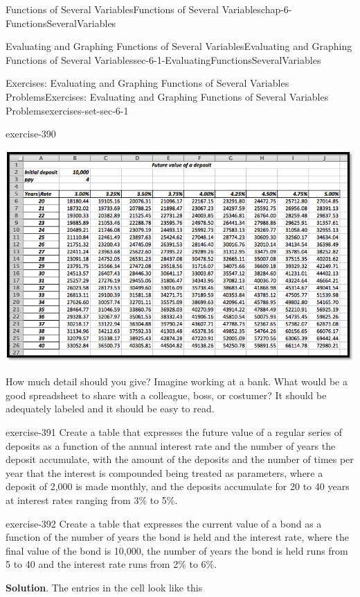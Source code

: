 \documentclass[oneside,10pt,]{book}
\numberwithin{equation}{section}
\begin{document}
\begin{chapterptx}{Functions of Several Variables}{}{Functions of Several Variables}{}{}{chap-6-FunctionsSeveralVariables}
\begin{sectionptx}{Evaluating and Graphing Functions of Several Variables}{}{Evaluating and Graphing Functions of Several Variables}{}{}{sec-6-1-EvaluatingFunctionsSeveralVariables}
\begin{exercises-subsection-numberless}{Exercises: Evaluating and Graphing Functions of Several Variables Problems}{}{Exercises: Evaluating and Graphing Functions of Several Variables Problems}{}{}{exercises-set-sec-6-1}
\begin{exercisegroup}
\begin{divisionexerciseeg}{13}{}{}{exercise-390}
\begin{sidebyside}{1}{0}{0}{0}
\begin{sbspanel}{1}
\includegraphics[width=1\linewidth]{images/sec6-1-sol13b.png}
\end{sbspanel}%
\end{sidebyside}%
\par
\hypertarget{p-2194}{}%
How much detail should you give? Imagine working at a bank. What would be a good spreadsheet to share with a colleague, boss, or costumer? It should be adequately labeled and it should be easy to read.%
\end{divisionexerciseeg}%
\begin{divisionexerciseeg}{14}{}{}{exercise-391}%
\hypertarget{p-2195}{}%
Create a table that expresses the future value of a regular series of deposits as a function of the annual interest rate and the number of years the deposit accumulate, with the amount of the deposits and the number of times per year that the interest is compounded being treated as parameters, where a deposit of \textdollar{}2,000 is made monthly, and the deposits accumulate for 20 to 40 years at interest rates ranging from 3\% to 5\%.%
\end{divisionexerciseeg}%
\begin{divisionexerciseeg}{15}{}{}{exercise-392}%
\hypertarget{p-2196}{}%
Create a table that expresses the current value of a bond as a function of the number of years the bond is held and the interest rate, where the final value of the bond is \textdollar{}10,000, the number of years the bond is held runs from 5 to 40 and the interest rate runs from 2\% to 6\%.%
\par\smallskip%
\noindent\textbf{Solution}.\hypertarget{solution-197}{}\quad%
\hypertarget{p-2197}{}%
The entries in the cell look like this%
\begin{sidebyside}{1}{0.05}{0.05}{0}%

\end{sidebyside}
\end{divisionexerciseeg}
\end{exercisegroup}
\end{exercises-subsection-numberless}
\end{sectionptx}
\end{chapterptx}
\end{document}
